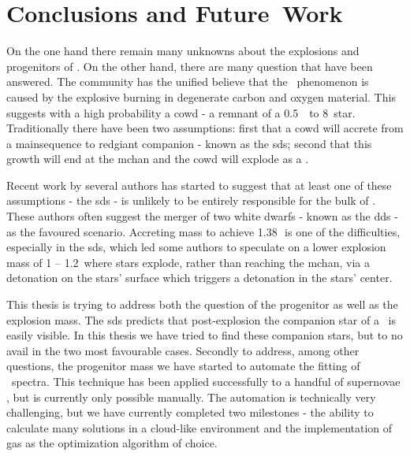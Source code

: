 \chapter{Conclusions and Future~Work}
\label{chap:conclusion}

On the one hand there remain many unknowns about the explosions and progenitors of \sneia. On the other hand, there are many question that have been answered. The community has the unified believe that the \snia\ phenomenon is caused by the explosive burning in degenerate carbon and oxygen material. This suggests with a high probability a \gls{cowd} - a remnant of a 0.5~\msun\ to 8~\msun star. Traditionally there have been two assumptions: first that a \gls{cowd} will accrete from a \gls{mainsequence} to \gls{redgiant} companion - known as the \gls{sds}; second that this growth will end at the \gls{mchan} and the \gls{cowd} will explode as a \snia. 

Recent work by several authors \citep[e.g.][]{2011arXiv1106.4008B, 2010ApJ...722.1691H, 2010MNRAS.407.1314M} has started to suggest that at least one of these assumptions - the \gls{sds} - is unlikely to be entirely responsible for the bulk of \sneia. These authors often suggest the merger of two white dwarfs - known as the \gls{dds} - as the favoured scenario. Accreting mass to achieve 1.38\,\msun\ is one of the difficulties, especially in the \gls{sds}, which led some authors to speculate on a lower explosion mass of 1 -- 1.2\,\msun \citep[e.g.][]{2010ApJ...714L..52S} where stars explode, rather than reaching the \gls{mchan}, via a detonation on the stars' surface which triggers a detonation in the stars' center. 

This thesis is trying to address both the question of the progenitor as well as the explosion mass. The \gls{sds} predicts that post-explosion the companion star of a \snia\ is easily visible. In this thesis we have tried to find these companion stars, but to no avail in the two most favourable cases. 
Secondly to address, among other questions, the progenitor mass we have started to automate the fitting of \snia\ spectra. This technique has been applied successfully to a handful of supernovae \citep{2007Sci...315..825M}, but is currently only possible manually. The automation is technically very challenging, but we have currently completed two milestones - the ability to calculate many solutions in a cloud-like environment and the implementation of \glspl{ga} as the optimization algorithm of choice. 

